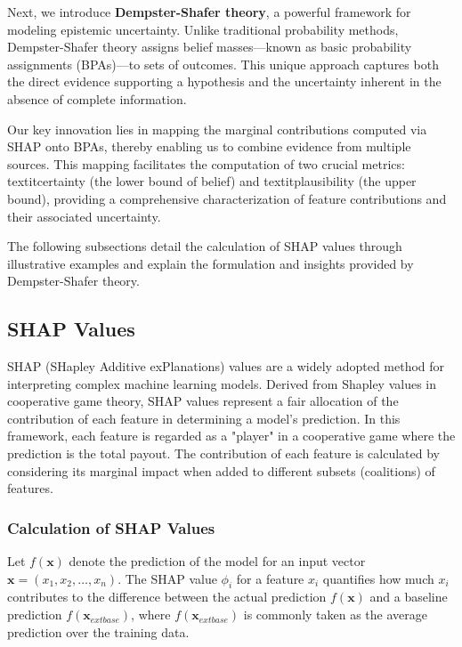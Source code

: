 \documentclass[acmlarge]{acmart}
\begin{document}
Next, we introduce \textbf{Dempster-Shafer theory}, a powerful framework for modeling epistemic uncertainty. Unlike traditional probability methods, Dempster-Shafer theory assigns belief masses—known as basic probability assignments (BPAs)—to sets of outcomes. This unique approach captures both the direct evidence supporting a hypothesis and the uncertainty inherent in the absence of complete information.

Our key innovation lies in mapping the marginal contributions computed via SHAP onto BPAs, thereby enabling us to combine evidence from multiple sources. This mapping facilitates the computation of two crucial metrics: textit{certainty} (the lower bound of belief) and textit{plausibility} (the upper bound), providing a comprehensive characterization of feature contributions and their associated uncertainty.

The following subsections detail the calculation of SHAP values through illustrative examples and explain the formulation and insights provided by Dempster-Shafer theory.


\subsection{SHAP Values}

SHAP (SHapley Additive exPlanations) values are a widely adopted method for interpreting complex machine learning models. Derived from Shapley values in cooperative game theory, SHAP values represent a fair allocation of the contribution of each feature in determining a model's prediction. In this framework, each feature is regarded as a "player" in a cooperative game where the prediction is the total payout. The contribution of each feature is calculated by considering its marginal impact when added to different subsets (coalitions) of features.

\subsubsection{Calculation of SHAP Values}

Let \( f(\mathbf{x}) \) denote the prediction of the model for an input vector \( \mathbf{x} = (x_1, x_2, \dots, x_n) \). The SHAP value \( \phi_i \) for a feature \( x_i \) quantifies how much \( x_i \) contributes to the difference between the actual prediction \( f(\mathbf{x}) \) and a baseline prediction \( f(\mathbf{x}_{ext{base}}) \), where \( f(\mathbf{x}_{ext{base}}) \) is commonly taken as the average prediction over the training data.
\end{document}
